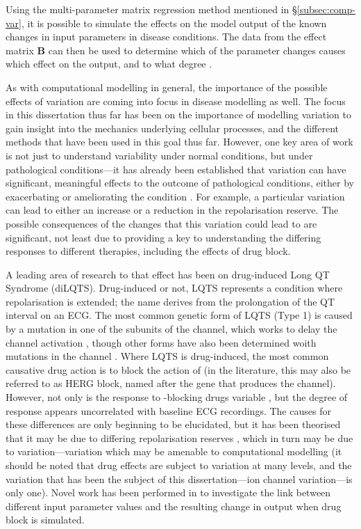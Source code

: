 \documentclass[../thesis-main.tex]{subfiles}
\begin{document}
 Using the multi-parameter matrix regression method mentioned in \S\ref{subsec:comp-var}, it is possible to simulate the effects on the model output of the known changes in input parameters in disease conditions. The data from the effect matrix $\mathbf{B}$ can then be used to determine which of the parameter changes causes which effect on the output, and to what degree \citep{Sarkar2012}.
 
 As with computational modelling in general, the importance of the possible effects of variation are coming into focus in disease modelling as well. The focus in this dissertation thus far has been on the importance of modelling variation to gain insight into the mechanics underlying cellular processes, and the different methods that have been used in this goal thus far. However, one key area of work is not just to understand variability under normal conditions, but under pathological conditions---it has already been established that variation can have significant, meaningful effects to the outcome of pathological conditions, either by exacerbating or ameliorating the condition \citep{Sarkar2012, John2012}. For example, a particular variation can lead to either an increase or a reduction in the repolarisation reserve. The possible consequences of the changes that this variation could lead to are significant, not least due to providing a key to understanding the differing responses to different therapies, including the effects of drug block.
 
 A leading area of research to that effect has been on drug-induced Long QT Syndrome (diLQTS). Drug-induced or not, LQTS represents a condition where repolarisation is extended; the name derives from the prolongation of the QT interval on an ECG. The most common genetic form of LQTS (Type 1) is caused by a mutation in one of the subunits of the \iks{} channel, which works to delay the channel activation \citep{Jons2011, Hoefen2012, Jou2013}, though other forms have also been determined woith mutations in the \ina{} channel \citep{Hashambhoy2011}. Where LQTS is drug-induced, the most common causative drug action is to block the action of \ikr{} (in the literature, this may also be referred to as HERG block, named after the gene that produces the channel). However, not only is the response to \ikr{}-blocking drugs variable \citep{Kannankeril2010}, but the degree of response appears uncorrelated with baseline ECG recordings. The causes for these differences are only beginning to be elucidated, but it has been theorised that it may be due to differing repolarisation reserves \citep{Varro2011}, which in turn may be due to variation---variation which may be amenable to computational modelling (it should be noted that drug effects are subject to variation at many levels, and the variation that has been the subject of this dissertation---ion channel variation---is only one). Novel work has been performed in \citet{Sarkar2011} to investigate the link between different input parameter values and the resulting change in output when drug block is simulated.
 
\end{document}
